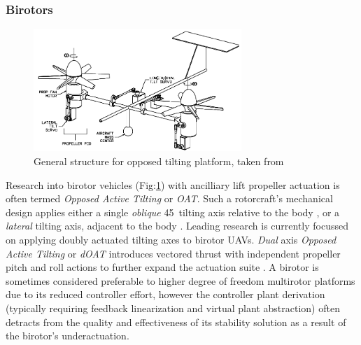\subsubsection*{Birotors}
\begin{figure}[hbtp]
\centering
\includegraphics[width=0.7\textwidth]{figs/dualaxistilt}
\caption{General structure for opposed tilting platform, taken from\cite{gres2007}}
\label{fig:dualaxistilt}
\end{figure}
Research into birotor vehicles (Fig:\ref{fig:dualaxistilt}) with ancilliary lift propeller actuation is often termed \emph{Opposed Active Tilting} or \emph{OAT}. Such a rotorcraft's mechanical design applies either a single \emph{oblique} 45\textdegree ~tilting axis relative to the body \cite{smalltwotilting,obliquepitch}, or a \emph{lateral} tilting axis, adjacent to the body \cite{tiltrotorUAV,adaptivebackstep,tiltrotorcontrol,tpheonix}. Leading research is currently focussed on applying doubly actuated tilting axes to birotor UAVs. \emph{Dual} axis \emph{Opposed Active Tilting} or \emph{dOAT} introduces vectored thrust with independent propeller pitch and roll actions to further expand the actuation suite \cite{gres2007,opposedlateraldualaxis}. A birotor is sometimes considered preferable to higher degree of freedom multirotor platforms due to its reduced controller effort, however the controller plant derivation (typically requiring feedback linearization and virtual plant abstraction) often detracts from the quality and effectiveness of its stability solution as a result of the birotor's underactuation. 
\par
